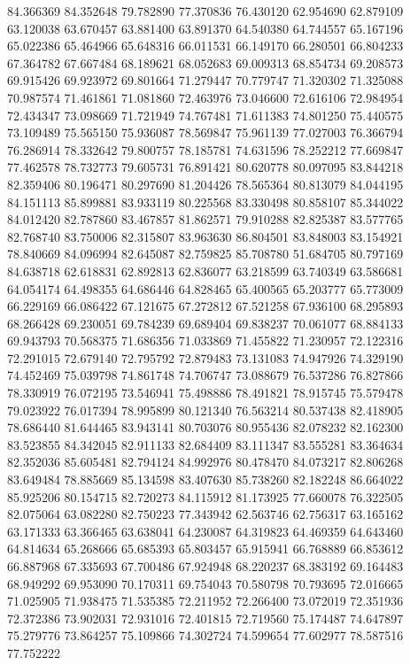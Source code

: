 84.366369
84.352648
79.782890
77.370836
76.430120
62.954690
62.879109
63.120038
63.670457
63.881400
63.891370
64.540380
64.744557
65.167196
65.022386
65.464966
65.648316
66.011531
66.149170
66.280501
66.804233
67.364782
67.667484
68.189621
68.052683
69.009313
68.854734
69.208573
69.915426
69.923972
69.801664
71.279447
70.779747
71.320302
71.325088
70.987574
71.461861
71.081860
72.463976
73.046600
72.616106
72.984954
72.434347
73.098669
71.721949
74.767481
71.611383
74.801250
75.440575
73.109489
75.565150
75.936087
78.569847
75.961139
77.027003
76.366794
76.286914
78.332642
79.800757
78.185781
74.631596
78.252212
77.669847
77.462578
78.732773
79.605731
76.891421
80.620778
80.097095
83.844218
82.359406
80.196471
80.297690
81.204426
78.565364
80.813079
84.044195
84.151113
85.899881
83.933119
80.225568
83.330498
80.858107
85.344022
84.012420
82.787860
83.467857
81.862571
79.910288
82.825387
83.577765
82.768740
83.750006
82.315807
83.963630
86.804501
83.848003
83.154921
78.840669
84.096994
82.645087
82.759825
85.708780
51.684705
80.797169
84.638718
62.618831
62.892813
62.836077
63.218599
63.740349
63.586681
64.054174
64.498355
64.686446
64.828465
65.400565
65.203777
65.773009
66.229169
66.086422
67.121675
67.272812
67.521258
67.936100
68.295893
68.266428
69.230051
69.784239
69.689404
69.838237
70.061077
68.884133
69.943793
70.568375
71.686356
71.033869
71.455822
71.230957
72.122316
72.291015
72.679140
72.795792
72.879483
73.131083
74.947926
74.329190
74.452469
75.039798
74.861748
74.706747
73.088679
76.537286
76.827866
78.330919
76.072195
73.546941
75.498886
78.491821
78.915745
75.579478
79.023922
76.017394
78.995899
80.121340
76.563214
80.537438
82.418905
78.686440
81.644465
83.943141
80.703076
80.955436
82.078232
82.162300
83.523855
84.342045
82.911133
82.684409
83.111347
83.555281
83.364634
82.352036
85.605481
82.794124
84.992976
80.478470
84.073217
82.806268
83.649484
78.885669
85.134598
83.407630
85.738260
82.182248
86.664022
85.925206
80.154715
82.720273
84.115912
81.173925
77.660078
76.322505
82.075064
63.082280
82.750223
77.343942
62.563746
62.756317
63.165162
63.171333
63.366465
63.638041
64.230087
64.319823
64.469359
64.643460
64.814634
65.268666
65.685393
65.803457
65.915941
66.768889
66.853612
66.887968
67.335693
67.700486
67.924948
68.220237
68.383192
69.164483
68.949292
69.953090
70.170311
69.754043
70.580798
70.793695
72.016665
71.025905
71.938475
71.535385
72.211952
72.266400
73.072019
72.351936
72.372386
73.902031
72.931016
72.401815
72.719560
75.174487
74.647897
75.279776
73.864257
75.109866
74.302724
74.599654
77.602977
78.587516
77.752222
